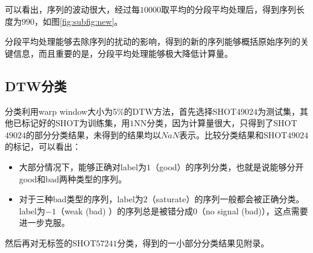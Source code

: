 \documentclass[noindent]{ctexart}
\begin{document}
可以看出，序列的波动很大，经过每$10000$取平均的分段平均处理后，得到序列长度为$990$，如图\ref{fig:subfig:new}。

分段平均处理能够去除序列的扰动的影响，得到的新的序列能够概括原始序列的关键信息，而且重要的是，分段平均处理能够极大降低计算量。

\subsection*{DTW分类}
分类利用warp window大小为5\%的DTW方法，首先选择SHOT$49024$为测试集，其他已标记好的SHOT为训练集，用$1$NN分类，因为计算量很大，只得到了SHOT$49024$的部分分类结果，未得到的结果均以$NaN$表示。比较分类结果和SHOT$49024$的标记，可以看出：
\begin{itemize}
 \item 大部分情况下，能够正确对label为$1$（good）的序列分类，也就是说能够分开good和bad两种类型的序列。
 \item 对于三种bad类型的序列，label为$2$（saturate）的序列一般都会被正确分类。label为$-1$（weak (bad)	
）的序列总是被错分成$0$（no signal (bad)），这点需要进一步克服。
\end{itemize}

然后再对无标签的SHOT$57241$分类，得到的一小部分分类结果见附录。
\end{document}
